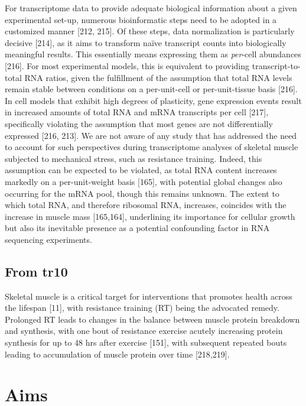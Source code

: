 \documentclass[twoside,10pt]{gihclass} %
\begin{document}
For transcriptome data to provide adequate biological information about a given experimental set-up, numerous bioinformatic steps need to be adopted in a customized manner {[}212, 215{]}.
Of these steps, data normalization is particularly decisive {[}214{]},
as it aims to transform naïve transcript counts into biologically meaningful results. This essentially means expressing them as \emph{per}-cell abundances {[}216{]}.
For most experimental models, this is equivalent to providing transcript-to-total RNA ratios, given the fulfillment of the assumption that total RNA levels remain stable between conditions on a per-unit-cell or per-unit-tissue basis {[}216{]}.
In cell models that exhibit high degrees of plasticity, gene expression events result in increased amounts of total RNA and mRNA transcripts per cell {[}217{]}, specifically violating the assumption that most genes are not differentially expressed {[}216, 213{]}.
We are not aware of any study that has addressed the need to account for such perspectives during transcriptome analyses of skeletal muscle subjected to mechanical stress, such as resistance training. Indeed, this assumption can be expected to be violated, as total RNA content increases markedly on a per-unit-weight basis {[}165{]}, with potential global changes also occurring for the mRNA pool, though this remains unknown. The extent to which total RNA, and therefore ribosomal RNA, increases, coincides with the increase in muscle mass {[}165,164{]}, underlining its importance for cellular growth but also its inevitable presence as a potential confounding factor in RNA sequencing experiments.

\hypertarget{from-tr10}{%
\section{From tr10}\label{from-tr10}}

Skeletal muscle is a critical target for interventions that promotes health across the lifespan {[}11{]},
with resistance training (RT) being the advocated remedy.\\
Prolonged RT leads to changes in the balance between muscle protein breakdown and synthesis, with one bout of resistance exercise acutely increasing protein synthesis for up to 48 hrs after exercise {[}151{]},
with subsequent repeated bouts leading to accumulation of muscle protein over time
{[}218,219{]}.

\hypertarget{aims}{%
\chapter{Aims}\label{aims}}
\end{document}
